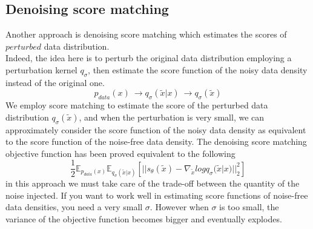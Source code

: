 \documentclass{article}
\begin{document}
	\subsection{Denoising score matching}
	Another approach is denoising score matching which estimates the scores of $perturbed$ data distribution.\\
	Indeed, the idea here is to perturb the original data distribution employing a perturbation kernel $q_{\sigma}$, then estimate the score function of the noisy data density instead of the original one.
	\begin{equation}
	p_{data}(x)\ \longrightarrow q_{\sigma}(\tilde{x}|x)\ \longrightarrow q_{\sigma}(\tilde{x})
	\end{equation}
	We employ score matching to estimate the score of the perturbed data distribution $q_{\sigma}(\tilde{x})$, and when the perturbation is very small, we can approximately consider the score function of the noisy data density as equivalent to the score function of the noise-free data density. The denoising score matching objective function has been proved equivalent to the following
	\begin{equation}
	\frac{1}{2} \mathbb{E}_{p_{data}(x)} \mathbb{E}_{q_{\sigma}(\tilde{x}|x)}[||s_{\theta}(\tilde{x}) - \nabla_{\tilde{x}}logq_{\sigma}(\tilde{x}|x)||_{2}^{2}]
	\end{equation}
	in this approach we must take care of the trade-off between the quantity of the noise injected. If you want to work well in estimating score functions of noise-free data densities, you need a very small $\sigma$. However when $\sigma$ is too small, the variance of the objective function becomes bigger and eventually explodes. 
\end{document}
